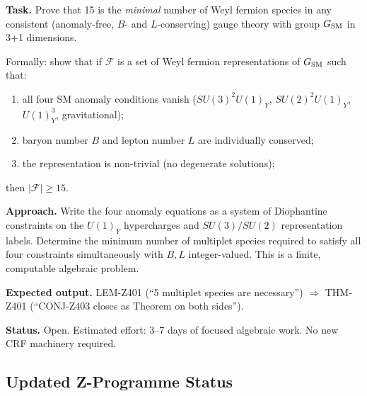 \documentclass[12pt, a4paper]{article}
\begin{document}
\begin{openqbox}[title={GAP-TC01 / Z4b: SM Minimality (open)}]
\textbf{Task.} Prove that 15 is the \emph{minimal} number of
Weyl fermion species in any consistent (anomaly-free, $B$- and
$L$-conserving) gauge theory with group $G_{\rm SM}$ in
3+1 dimensions.

Formally: show that if $\mathcal{F}$ is a set of Weyl fermion
representations of $G_{\rm SM}$ such that:
\begin{enumerate}[leftmargin=*, label=(\roman*), noitemsep]
  \item all four SM anomaly conditions vanish
    ($SU(3)^2 U(1)_Y$, $SU(2)^2 U(1)_Y$, $U(1)_Y^3$, gravitational);
  \item baryon number $B$ and lepton number $L$ are individually
    conserved;
  \item the representation is non-trivial (no degenerate solutions);
\end{enumerate}
then $|\mathcal{F}| \geq 15$.

\textbf{Approach.} Write the four anomaly equations as a
system of Diophantine constraints on the $U(1)_Y$ hypercharges
and $SU(3)/SU(2)$ representation labels. Determine the minimum
number of multiplet species required to satisfy all four constraints
simultaneously with $B, L$ integer-valued. This is a finite,
computable algebraic problem.

\textbf{Expected output.} LEM-Z401 (``5 multiplet species are
necessary'') $\Rightarrow$ THM-Z401 (``CONJ-Z403 closes as
Theorem on both sides'').

\textbf{Status.} Open. Estimated effort: 3--7 days of focused
algebraic work. No new CRF machinery required.
\end{openqbox}

\subsection{Updated Z-Programme Status}
\label{sec:status}
\end{document}
